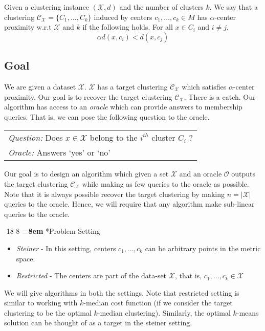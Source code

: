 \documentclass[orivec]{llncs}
\makeatletter
\newcommand{\mc}{\mathcal}
\renewcommand\subsubsection{\@startsection{subsubsection}{3}{\z@}%
   {-18\p@ \@plus -4\p@ \@minus -4\p@}%
   {8\p@ \@plus 4\p@ \@minus 4\p@}%
   {\normalfont\normalsize\bfseries\boldmath
   \rightskip=\z@ \@plus 8em \pretolerance=10000}}
\makeatother
\begin{document}
\begin{definition}
\label{defn:alphacp}
Given a clustering instance $(\mc X, d)$ and the number of clusters $k$. We say that a clustering $\mc C_{\mc X} = \{C_1, \ldots, C_k\}$ induced by centers $c_1, \ldots, c_k \in M$ has $\alpha$-center proximity w.r.t $\mc X$ and $k$ if the following holds. For all $x \in C_i$ and $i\neq j$, 
$$\alpha d(x, c_i) < d(x, c_j)$$
\end{definition}

\subsection{Goal}
We are given a dataset $\mc X$. $\mc X$ has a target clustering $\mc C_{\mc X}$ which satisfies $\alpha$-center proximity. Our goal is to recover the target clustering $\mc C_{\mc X}$. There is a catch. Our algorithm has access to an {\it oracle} which can provide answers to membership queries. That is, we can pose the following question to the oracle.
\begin{center}
  \begin{tabular}{l}
	{\it Question:} Does $x \in \mc X$ belong to the $i^{th}$ cluster $C_i$ ? \\
	{\it Oracle:} Answers `yes' or `no'
  \end{tabular}
\end{center}

\noindent Our goal is to design an algorithm which given a set $\mc X$ and an oracle $\mc O$ outputs the target clustering $\mc C_{\mc X}$ while making as few queries to the oracle as possible. Note that it is always possible recover the target clustering by making $n = |\mc X|$ queries to the oracle. Hence, we will require that any algorithm make sub-linear queries to the oracle. 

\subsubsection*{Problem Setting}
\begin{itemize}[nolistsep, noitemsep]
\item {\it Steiner} - In this setting, centers $c_1, \ldots, c_k$ can be arbitrary points in the metric space.
\item {\it Restricted} - The centers are part of the data-set $\mc X$, that is, $c_1, \ldots, c_k \in \mc X$ \\
\end{itemize}
We will give algorithms in both the settings. Note that restricted setting is similar to working with $k$-median cost function (if we consider the target clustering to be the optimal $k$-median clustering). Similarly, the optimal $k$-means solution can be thought of as a target in the steiner setting.
\end{document}

